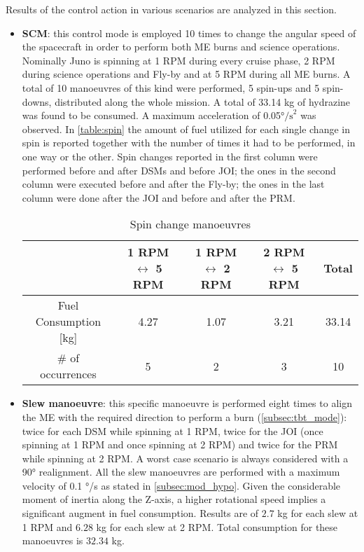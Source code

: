 Results of the control action in various scenarios are analyzed in this section.
\begin{itemize}
    \item \textbf{SCM}: this control mode is employed 10 times to change the angular speed of the spacecraft in order to perform both ME burns and science operations. Nominally Juno is spinning at 1 RPM during every cruise phase, 2 RPM during science operations and Fly-by and at 5 RPM during all ME burns. A total of 10 manoeuvres of this kind were performed, 5 spin-ups and 5 spin-downs, distributed along the whole mission.  A total of 33.14 kg of hydrazine was found to be consumed. A maximum acceleration of 0.05°$\textrm{/s}^2$ was observed. In \autoref{table:spin} the amount of fuel utilized for each single change in spin is reported together with the number of times it had to be performed, in one way or the other. Spin changes reported in the first column were performed before and after DSMs and before JOI; the ones in the second column were executed before and after the Fly-by; the ones in the last column were done after the JOI and before and after the PRM.
    
    \vspace*{-2mm}
    \begin{table}[H]
        \renewcommand{\arraystretch}{1.3}
        \centering
        \small
        \begin{tabular}{|c|c|c|c|c|}
            \hline
            &\textbf{1 RPM $\leftrightarrow$ 5 RPM } & \textbf{1 RPM $\leftrightarrow$ 2 RPM } &\textbf{2 RPM $\leftrightarrow$ 5 RPM} & \textbf{Total} \\
            \hline
            \hline
            Fuel Consumption [kg] & 4.27 & 1.07 & 3.21 & 33.14 \\
            \hline
            \# of occurrences & 5 & 2 & 3 & 10 \\
            \hline
        \end{tabular}
        \caption{Spin change manoeuvres}
        \label{table:spin}
    \end{table}
    \vspace*{-4mm}

    \item \textbf{Slew manoeuvre}: this specific manoeuvre is performed eight times to align the ME with the required direction to perform a burn (\autoref{subsec:tbt_mode}): twice for each DSM while spinning at 1 RPM, twice for the JOI (once spinning at 1 RPM and once spinning at 2 RPM) and twice for the PRM while spinning at 2 RPM. A worst case scenario is always considered with a 90° realignment. \cite{LL_early_cruise} 
    All the slew manoeuvres are performed with a maximum velocity of 0.1 °/s as stated in \autoref{subsec:mod_hypo}. 
    Given the considerable moment of inertia along the Z-axis, a higher rotational speed implies a significant augment in fuel consumption. Results are of $2.7$ kg for each slew at 1 RPM and $6.28$ kg for each slew at 2 RPM. Total consumption for these manoeuvres is $32.34$ kg. 
    

\end{itemize}
